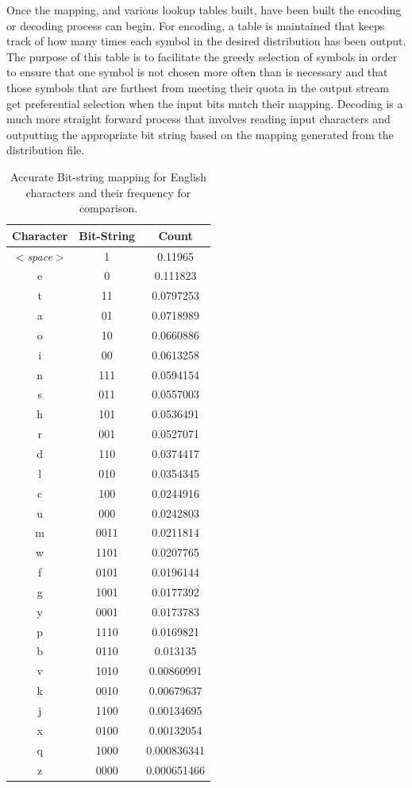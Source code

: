 \documentclass[12pt]{report}
\theoremstyle{remark}
\theoremstyle{definition}
\theoremstyle{definition}
\theoremstyle{definition}
\begin{document}
\begin{appendices}
Once the mapping, and various lookup tables built, have been built the
encoding or decoding process can begin. For encoding, a table is maintained that
keeps track of how many times each symbol in the desired distribution has been
output. The purpose of this table is to facilitate the greedy selection of
symbols in order to ensure that one symbol is not chosen more often than is
necessary and that those symbols that are farthest from meeting their quota in
the output stream get preferential selection when the input bits match their
mapping. Decoding is a much more straight forward process that involves reading
input characters and outputting the appropriate bit string based on the mapping
generated from the distribution file.

\begin{table}
\centering
\begin{tabular}{ c | c | c }
Character&Bit-String&Count\\
\hline
$<$\emph{space}$>$&1          &0.11965   \\
e&0    &0.111823  \\
t&11    &0.0797253\\
a&01    &0.0718989\\
o&10    &0.0660886\\
i&00    &0.0613258\\
n&111    &0.0594154\\
s&011    &0.0557003\\
h&101    &0.0536491\\
r&001    &0.0527071\\
d&110    &0.0374417\\
l&010    &0.0354345\\
c&100    &0.0244916\\
u&000    &0.0242803\\
m&0011    &0.0211814\\
w&1101    &0.0207765\\
f&0101    &0.0196144\\
g&1001    &0.0177392\\
y&0001    &0.0173783\\
p&1110    &0.0169821\\
b&0110    &0.013135\\
v&1010    &0.00860991\\
k&0010    &0.00679637\\
j&1100    &0.00134695\\
x&0100    &0.00132054\\
q&1000    &0.000836341\\
z&0000    &0.000651466\\
\end{tabular}
\caption[English Character Bit-String Mapping - Accurate]{Accurate Bit-string mapping for English characters and their frequency for comparison.}
\label{TABLE_unigrammapping_acc}
\end{table}


\end{appendices}
\end{document}
